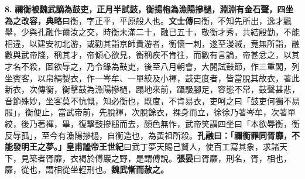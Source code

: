 \textbf{8.} \textbf{禰衡被魏武謫為鼓吏，正月半試鼓，衡揚枹為漁陽摻檛，淵淵有金石聲，四坐為之改容，}{\footnotesize \textbf{典略}曰衡，字正平，平原般人也。\textbf{文士傳}曰衡，不知先所出，逸才飄舉，少與孔融作爾汝之交，時衡未滿二十，融已五十，敬衡才秀，共結殷勤，不能相違，以建安初北游，或勸其詣京師貴游者，衡懷一刺，遂至漫滅，竟無所詣，融數與武帝牋，稱其才，帝傾心欲見，衡稱疾不肯往，而數有言論，帝甚忿之，以其才名不殺，圖欲辱之，乃令錄為鼓吏，後至八月朝會，大閱試鼓節，作三重閣，列坐賓客，以帛絹製衣，作一岑牟、一單絞及小褌，鼓吏度者，皆當脫其故衣，著此新衣，次傳衡，衡擊鼓為漁陽摻檛，蹋地來前，躡馺腳足，容態不常，鼓聲甚悲，音節殊妙，坐客莫不忼慨，知必衡也，既度，不肯易衣，吏呵之曰「鼓吏何獨不易服」，衡便止，當武帝前，先脫褌，次脫餘衣，裸身而立，徐徐乃著岑牟，次著單絞，後乃著褌，畢，復擊鼓摻槌而去，顏色無怍，武帝笑謂四坐曰「本欲辱衡，衡反辱孤」，至今有漁陽摻檛，自衡造也，為黃祖所殺。}\textbf{孔融曰：「禰衡罪同胥靡，不能發明王之夢。」}{\footnotesize \textbf{皇甫謐帝王世紀}曰武丁夢天賜己賢人，使百工寫其象，求諸天下，見築者胥靡，衣褐於傅巖之野，是謂傅說。\textbf{張晏}曰胥靡，刑名，胥，相也，靡，從也，謂相從坐輕刑也。}\textbf{魏武慚而赦之。}

